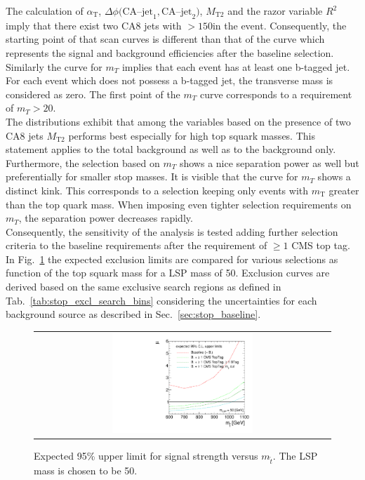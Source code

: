 The calculation of $\alpha_\mathrm{T}$, $\Delta \phi(\mathrm{CA}$--$\mathrm{jet}_1, \mathrm{CA}$--$\mathrm{jet}_2)$, $M_\mathrm{T2}$ and the razor variable $R^2$ imply that there exist two CA8 jets with \pt$> 150$\gev in the event. Consequently, the starting point of that scan curves is different than that of the \met curve which represents the signal and background efficiencies after the baseline selection. Similarly the curve for $m_T$ implies that each event has at least one b-tagged jet. For each event which does not possess a b-tagged jet, the transverse mass is considered as zero. The first point of the $m_T$ curve corresponds to a requirement of $m_T > 20$\gev.  \\
The distributions exhibit that among the variables based on the presence of two CA8 jets $M_\mathrm{T2}$ performs best especially for high top squark masses. This statement applies to the total background as well as to the \ttbar background only. Furthermore, the selection based on $m_T$ shows a nice separation power as well but preferentially for smaller stop masses. It is visible that the curve for $m_T$ shows a distinct kink. This corresponds to a selection keeping only events with $m_\mathrm{T}$ greater than the top quark mass. When imposing even tighter selection requirements on $m_T$, the separation power decreases rapidly. \\ 
Consequently,  the sensitivity of the analysis is tested adding further selection criteria to the baseline requirements after the requirement of $\ge 1$ CMS top tag. In Fig.~\ref{fig:stop_baselinetoptag_limit} the expected exclusion limits are compared for various selections as function of the top squark mass for a LSP mass of 50\gev. Exclusion curves are derived based on the same exclusive search regions as defined in Tab.~\ref{tab:stop_excl_search_bins} considering the uncertainties for each background source as described in Sec.~\ref{sec:stop_baseline}. \\
\begin{figure}[!h]
  \centering
  \begin{tabular}{c}
                \includegraphics[width=0.49\textwidth]{figures/limitplot4BinSel_BaselineBTagTopTagTransverseMass.pdf} 
  \end{tabular}
  \caption{Expected 95\% upper limit for signal strength versus $m_{\tilde{t}}$. The LSP mass is chosen to be 50\gev.}
  \label{fig:stop_baselinetoptag_limit}
\end{figure}

